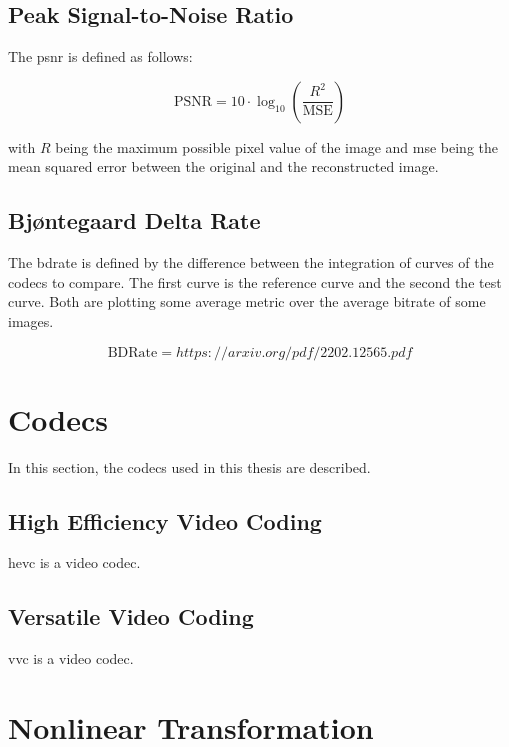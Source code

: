 \subsection{Peak Signal-to-Noise Ratio}
\label{subsec:psnr}

The \gls{psnr} is defined as follows:

\begin{equation}
    \text{PSNR} = 10 \cdot \log_{10} \left( \frac{R^2}{\text{MSE}} \right)
    \label{eq:psnr}
\end{equation}

with \(R\) being the maximum possible pixel value of the image and \gls{mse} being the mean squared error between the original and the reconstructed image.

\subsection{Bjøntegaard Delta Rate}
\label{subsec:bdrate}

The \gls{bdrate} is defined by the difference between the integration of curves of the codecs to compare. The first curve is the reference curve and the second the test curve. Both are plotting some average metric over the average bitrate of some images.

\begin{equation}
    \text{BDRate} = https://arxiv.org/pdf/2202.12565.pdf
    \label{eq:bdrate}
\end{equation}

\section{Codecs}
\label{sec:codecs}

In this section, the codecs used in this thesis are described.

\subsection{High Efficiency Video Coding}
\label{subsec:hevc}

\gls{hevc} is a video codec.

\subsection{Versatile Video Coding}
\label{subsec:vvc}

\gls{vvc} is a video codec.

\section{Nonlinear Transformation}
\label{sec:nonlinear}


